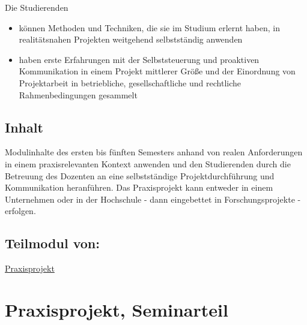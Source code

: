Die Studierenden

\begin{itemize}
\tightlist
\item
  können Methoden und Techniken, die sie im Studium erlernt haben, in
  realitätsnahen Projekten weitgehend selbstständig anwenden
\item
  haben erste Erfahrungen mit der Selbststeuerung und proaktiven
  Kommunikation in einem Projekt mittlerer Größe und der Einordnung von
  Projektarbeit in betriebliche, gesellschaftliche und rechtliche
  Rahmenbedingungen gesammelt
\end{itemize}

\hypertarget{inhaltpathlabelmi-2017modulbeschreibungen-bachelorba_praxisprojektarbeit}{%
\section*{Inhalt\label{/mi-2017/modulbeschreibungen-bachelor/BA_Praxisprojektarbeit}}\label{inhaltpathlabelmi-2017modulbeschreibungen-bachelorba_praxisprojektarbeit}}

Modulinhalte des ersten bis fünften Semesters anhand von realen
Anforderungen in einem praxisrelevanten Kontext anwenden und den
Studierenden durch die Betreuung des Dozenten an eine selbstständige
Projektdurchführung und Kommunikation heranführen. Das Praxisprojekt
kann entweder in einem Unternehmen oder in der Hochschule - dann
eingebettet in Forschungsprojekte - erfolgen.

\hypertarget{teilmodul-vonpathlabelmi-2017modulbeschreibungen-bachelorba_praxisprojektarbeit}{%
\section*{Teilmodul
von:\label{/mi-2017/modulbeschreibungen-bachelor/BA_Praxisprojektarbeit}}\label{teilmodul-vonpathlabelmi-2017modulbeschreibungen-bachelorba_praxisprojektarbeit}}

\hyperref[/mi-2017/modulbeschreibungen-bachelor/BA_Praxisprojekt]{Praxisprojekt}

\hypertarget{praxisprojekt-seminarteilpathlabelmi-2017modulbeschreibungen-bachelorba_praxisprojektseminar}{%
\chapter{Praxisprojekt,
Seminarteil\label{/mi-2017/modulbeschreibungen-bachelor/BA_Praxisprojektseminar}}\label{praxisprojekt-seminarteilpathlabelmi-2017modulbeschreibungen-bachelorba_praxisprojektseminar}}

